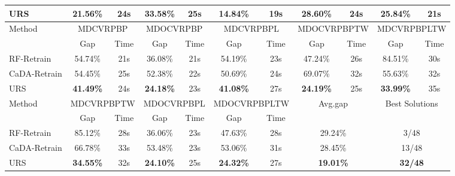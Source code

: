 \documentclass{article}
\theoremstyle{plain}
\theoremstyle{definition}
\theoremstyle{remark}
\begin{document}
\begin{table}[htbp]
{\begin{tabular}{l|cc|cc|cc|cc|cc}
    URS & 21.56\% & 24s   & \cellcolor[HTML]{D0CECE}\textbf{33.58\%} & 25s   & \cellcolor[HTML]{D0CECE}\textbf{14.84\%} & 19s   & \cellcolor[HTML]{D0CECE}\textbf{28.60\%} & 24s   & \cellcolor[HTML]{D0CECE}\textbf{25.84\%} & 21s \\
    \midrule
    \midrule
    \multirow{2}[2]{*}{Method} & \multicolumn{2}{c|}{MDCVRPBP} & \multicolumn{2}{c|}{MDOCVRPBP} & \multicolumn{2}{c|}{MDCVRPBPL} & \multicolumn{2}{c|}{MDOCVRPBPTW} & \multicolumn{2}{c}{MDCVRPBPLTW} \\
          & Gap   & Time  & Gap   & Time  & Gap   & Time  & Gap   & Time  & Gap   & Time \\
    \midrule
    RF-Retrain & 54.74\% & 21s   & 36.08\% & 21s   & 54.19\% & 23s   & 47.24\% & 26s   & 84.51\% & 30s \\
    CaDA-Retrain & 54.45\% & 25s   & 52.38\% & 22s   & 50.69\% & 24s   & 69.07\% & 32s   & 55.63\% & 32s \\
    URS & \cellcolor[HTML]{D0CECE}\textbf{41.49\%} & 24s   & \cellcolor[HTML]{D0CECE}\textbf{24.18\%} & 23s   & \cellcolor[HTML]{D0CECE}\textbf{41.08\%} & 27s   & \cellcolor[HTML]{D0CECE}\textbf{24.19\%} & 25s   & \cellcolor[HTML]{D0CECE}\textbf{33.99\%} & 35s \\
    \midrule
    \midrule
    \multirow{2}[2]{*}{Method} & \multicolumn{2}{c|}{MDCVRPBPTW} & \multicolumn{2}{c|}{MDOCVRPBPL} & \multicolumn{2}{c|}{MDOCVRPBPLTW} & \multicolumn{2}{c|}{\multirow{2}[2]{*}{Avg.gap}} & \multicolumn{2}{c}{\multirow{2}[2]{*}{Best Solutions}} \\
          & Gap   & Time  & Gap   & Time  & Gap   & Time  & \multicolumn{2}{c|}{} & \multicolumn{2}{c}{} \\
    \midrule
    RF-Retrain & 85.12\% & 28s   & 36.06\% & 23s   & 47.63\% & 28s   & \multicolumn{2}{c|}{29.24\%} & \multicolumn{2}{c}{3/48} \\
    CaDA-Retrain & 66.78\% & 33s   & 53.48\% & 23s   & 53.06\% & 31s   & \multicolumn{2}{c|}{28.45\%} & \multicolumn{2}{c}{13/48} \\
    URS & \cellcolor[HTML]{D0CECE}\textbf{34.55\%} & 32s   & \cellcolor[HTML]{D0CECE}\textbf{24.10\%} & 25s   & \cellcolor[HTML]{D0CECE}\textbf{24.32\%} & 27s   & \multicolumn{2}{c|}{\cellcolor[HTML]{D0CECE}\textbf{19.01\%}} & \multicolumn{2}{c}{\cellcolor[HTML]{D0CECE}\textbf{32/48}} \\
    \bottomrule[0.5mm]
    \end{tabular}%
    }
  \label{tab:urs_rf_cada_150epochs}%
\end{table}%
\end{document}
